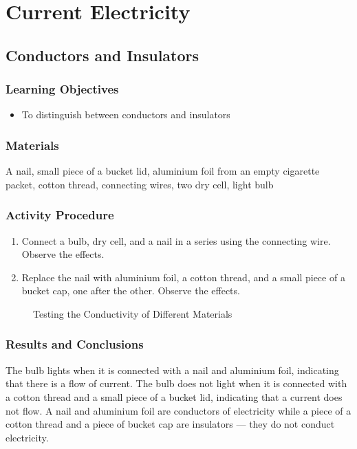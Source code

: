 \section{Current Electricity}

\subsection{Conductors and Insulators}

\subsubsection*{Learning Objectives}
\begin{itemize}
\item{To distinguish between conductors and insulators} 
\end{itemize}

\subsubsection*{Materials}
A nail, small piece of a bucket lid, aluminium foil from an empty cigarette packet, cotton thread, connecting wires, two dry cell, light bulb


\subsubsection*{Activity Procedure}
\begin{enumerate}
\item{Connect a bulb, dry cell, and a nail in a series using the connecting wire. Observe the effects.} 
\item{Replace the nail with aluminium foil, a cotton thread, and a small piece of a bucket cap, one after the other. Observe the effects.} 
\end{enumerate}

\begin{figure}
\begin{center}
\def\svgwidth{250pt}

\caption{Testing the Conductivity of Different Materials}
\label{fig:conductors-insulators}
\end{center}
\end{figure}

\subsubsection*{Results and Conclusions}
The bulb lights when it is connected with a nail and aluminium foil, indicating that there is a flow of current. The bulb does not light when it is connected with a cotton thread and a small piece of a bucket lid, indicating that a current does not flow. A nail and aluminium foil are conductors of electricity while a piece of a cotton thread and a piece of bucket cap are insulators --- they do not conduct electricity.

